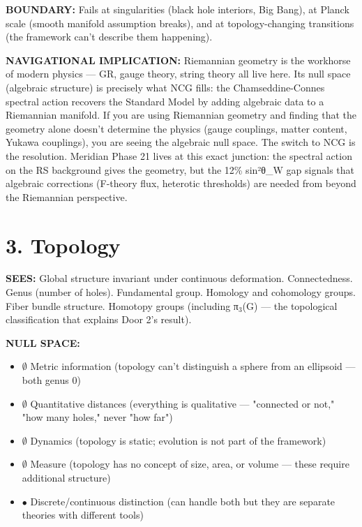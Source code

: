 \textbf{BOUNDARY:} Fails at singularities (black hole interiors, Big Bang), at Planck scale (smooth manifold assumption breaks), and at topology-changing transitions (the framework can't describe them happening).


\textbf{NAVIGATIONAL IMPLICATION:} Riemannian geometry is the workhorse of modern physics — GR, gauge theory, string theory all live here. Its null space (algebraic structure) is precisely what NCG fills: the Chamseddine-Connes spectral action recovers the Standard Model by adding algebraic data to a Riemannian manifold. If you are using Riemannian geometry and finding that the geometry alone doesn't determine the physics (gauge couplings, matter content, Yukawa couplings), you are seeing the algebraic null space. The switch to NCG is the resolution. Meridian Phase 21 lives at this exact junction: the spectral action on the RS background gives the geometry, but the 12\% sin²θ\_W gap signals that algebraic corrections (F-theory flux, heterotic thresholds) are needed from beyond the Riemannian perspective.


\bigskip\noindent\makebox[\textwidth]{\color{rulegray}\rule{5cm}{0.3pt}}\bigskip


\section*{3. Topology}


\textbf{SEES:} Global structure invariant under continuous deformation. Connectedness. Genus (number of holes). Fundamental group. Homology and cohomology groups. Fiber bundle structure. Homotopy groups (including π$_3$(G) — the topological classification that explains Door 2's result).


\textbf{NULL SPACE:}

\begin{itemize}[nosep,leftmargin=*]
  \item $\emptyset$ Metric information (topology can't distinguish a sphere from an ellipsoid — both genus 0)
  \item $\emptyset$ Quantitative distances (everything is qualitative — "connected or not," "how many holes," never "how far")
  \item $\emptyset$ Dynamics (topology is static; evolution is not part of the framework)
  \item $\emptyset$ Measure (topology has no concept of size, area, or volume — these require additional structure)
  \item $\bullet$ Discrete/continuous distinction (can handle both but they are separate theories with different tools)
\end{itemize}



